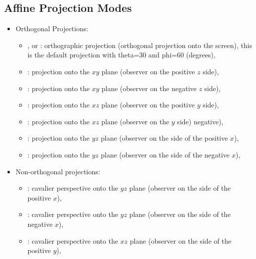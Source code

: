 \subsection{Affine Projection Modes}

\begin{itemize}

\item Orthogonal Projections:

\begin{itemize}
    \item {}, or : orthographic projection (orthogonal projection onto the screen), this is the default projection with theta=30 and phi=60 (degrees),

    \item {}: projection onto the $xy$ plane (observer on the positive $z$ side),

    \item {}: projection onto the $xy$ plane (observer on the negative $z$ side),

    \item {}: projection onto the $xz$ plane (observer on the positive $y$ side),

    \item {}: projection onto the $xz$ plane (observer on the $y$ side) negative),

    \item {}: projection onto the $yz$ plane (observer on the side of the positive $x$),

    \item {}: projection onto the $yz$ plane (observer on the side of the negative $x$),
\end{itemize}

\item Non-orthogonal projections:

\begin{itemize}
    \item {}: cavalier perspective onto the $yz$ plane (observer on the side of the positive $x$),

    \item {}: cavalier perspective onto the $yz$ plane (observer on the side of the negative $x$),

    \item {}: cavalier perspective onto the $xz$ plane (observer on the side of the positive $y$),


\end{itemize}
\end{itemize}
